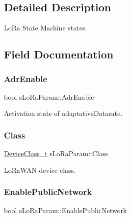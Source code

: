 \subsection{Detailed Description}
Lo\+Ra State Machine states 

\subsection{Field Documentation}
\mbox{\label{structsLoRaParam_aa6b992022ef325e70e97b10a7356381e}} 
\subsubsection{\texorpdfstring{Adr\+Enable}{AdrEnable}}
{\footnotesize\ttfamily bool s\+Lo\+Ra\+Param\+::\+Adr\+Enable}



Activation state of adaptative\+Datarate. 

\mbox{\label{structsLoRaParam_a3c241a0817ffb57f327d8ae3460befbb}} 
\subsubsection{\texorpdfstring{Class}{Class}}
{\footnotesize\ttfamily \hyperlink{group__LORAMAC_ga29dc2e097802faaf8fbd0e18ff99695f}{Device\+Class\+\_\+t} s\+Lo\+Ra\+Param\+::\+Class}



Lo\+Ra\+W\+AN device class. 

\mbox{\label{structsLoRaParam_a48c6a425b62951375d564de86927143f}} 
\subsubsection{\texorpdfstring{Enable\+Public\+Network}{EnablePublicNetwork}}
{\footnotesize\ttfamily bool s\+Lo\+Ra\+Param\+::\+Enable\+Public\+Network}



